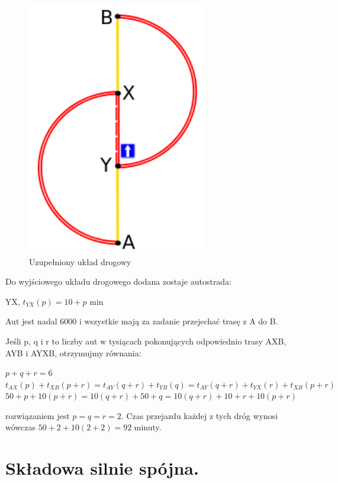 \documentclass[twoside,12pt]{report}
\begin{document}
\begin{figure}[ht]
\includegraphics[width=0.7\textwidth]{img/braess2}
\caption{Uzupełniony układ drogowy}
\end{figure}

Do wyjściowego układu drogowego dodana zostaje autostrada:

YX, $t_{YX}(p) =  10 + p$ min

Aut jest nadal 6000 i wszystkie mają za zadanie przejechać trasę z A do B.



Jeśli p, q i r to liczby aut w tysiącach pokonujących odpowiednio trasy AXB, AYB i AYXB, otrzymujmy równania:

\begin{center}
$p+q+r = 6 $
$t_{AX}(p)+t_{XB}(p+r) = t_{AY}(q+r) + t_{YB}(q) = t_{AY}(q+r)+t_{YX}(r)+t_{XB}(p+r)$
\newline
$50+p+10(p+r) = 10(q+r)+50+q = 10(q+r)+ 10 + r + 10(p+r)$
\end{center}
rozwiązaniem jest $p=q=r=2$.
Czas przejazdu każdej z tych dróg wynosi wówczas $50+2+10(2+2)=92$ minuty.

\section{Składowa silnie spójna.}
\end{document}
